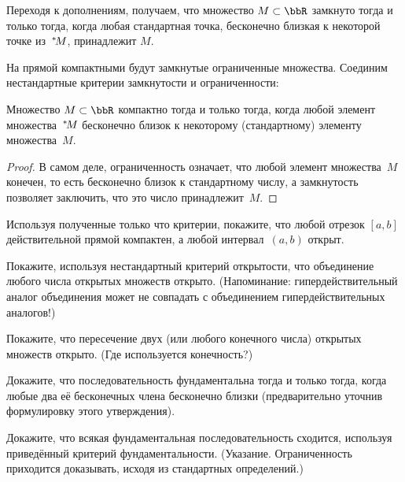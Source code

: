 Переходя к дополнениям, получаем, что множество $M\subset\bbR$
замкнуто тогда и только тогда, когда любая стандартная точка,
бесконечно близкая к некоторой точке из~${}^*\!M$, принадлежит
$M$.

На прямой компактными будут замкнутые ограниченные множества.
Соединим нестандартные критерии замкнутости и ограниченности:

\begin{theorem}
        \label{nonstandard-compactness}%
Множество $M\subset \bbR$ компактно%
%
тогда и только тогда,
когда любой элемент множества~${}^*\!M$ бесконечно близок
к некоторому (стандартному) элементу множества~$M$.
\end{theorem}

\begin{proof}
В самом деле, ограниченность означает, что любой элемент множества~$M$
конечен, то есть бесконечно близок к стандартному числу, а замкнутость
позволяет заключить, что это число принадлежит~$M$.
\end{proof}

\begin{problem}
Используя полученные только что критерии, покажите,
что любой отрезок $[a,b]$ действительной прямой
компактен, а любой интервал~$(a,b)$ открыт.
\end{problem}

\begin{problem}
Покажите, используя нестандартный критерий открытости, что
объединение любого числа открытых множеств открыто.
(Напоминание: гипердействительный аналог объединения может не
совпадать с объединением гипердействительных аналогов!)
\end{problem}

\begin{problem}
Покажите, что пересечение двух (или любого конечного числа)
открытых множеств открыто. (Где используется конечность?)
\end{problem}

\begin{problem}
Докажите, что последовательность фундаментальна тогда и
только тогда, когда любые два её бесконечных члена бесконечно
близки (предварительно уточнив формулировку этого утверждения).
\end{problem}

\begin{problem}
Докажите, что всякая фундаментальная последовательность сходится,
используя приведённый критерий фундаментальности. (Указание.
Ограниченность приходится доказывать, исходя из стандартных
определений.)
\end{problem}


